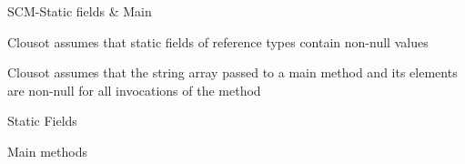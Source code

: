 \begin{frame}{SCM-Static fields \& Main}

\vspace*{-0.4cm}

Clousot assumes that static fields of reference types contain non-null values

\vspace*{0.6cm}

Clousot assumes that the string array passed to a main method and its elements
are non-null for all invocations of the method

\end{frame}


\begin{frame}[fragile]{Static Fields}
\vspace*{-0.4cm}
\only<1>{}
\end{frame}


\begin{frame}[fragile]{Main methods}
\vspace*{-0.4cm}
\only<1>{}
\end{frame}
